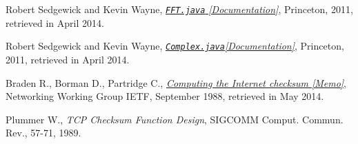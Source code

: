 \documentclass[12pt,a4paper,openright]{report}
\begin{document}
\begin{thebibliography}{1}
Robert Sedgewick and Kevin Wayne,
\href{http://introcs.cs.princeton.edu/java/97data/FFT.java.html}{\emph{\texttt{FFT.java} [Documentation]}},  Princeton, 2011, retrieved in April 2014.

Robert Sedgewick and Kevin Wayne,
\href{http://introcs.cs.princeton.edu/java/97data/Complex.java.html}{\emph{\texttt{Complex.java}[Documentation]}},  Princeton, 2011, retrieved in April 2014.


Braden R.,
Borman D., 
Partridge C., 
\href{http://tools.ietf.org/html/rfc1071}{\emph{Computing the Internet checksum [Memo]}}, Networking Working Group IETF,
September 1988, retrieved in May 2014.


Plummer W., \emph{TCP Checksum Function Design}, SIGCOMM Comput. Commun. Rev., 57-71, 1989.




\end{thebibliography}
\end{document}

